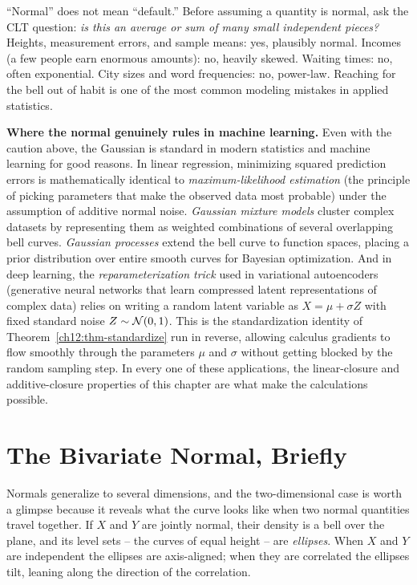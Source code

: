 \begin{trapbox}
``Normal'' does not mean ``default.'' Before assuming a quantity is normal, ask
the CLT question: \emph{is this an average or sum of many small independent
pieces?} Heights, measurement errors, and sample means: yes, plausibly normal.
Incomes (a few people earn enormous amounts): no, heavily skewed. Waiting times:
no, often exponential. City sizes and word frequencies: no, power-law. Reaching
for the bell out of habit is one of the most common modeling mistakes in applied
statistics.
\end{trapbox}

\begin{applicationbox}
\textbf{Where the normal genuinely rules in machine learning.} Even with the
caution above, the Gaussian is standard in modern statistics and machine
learning for good reasons. In linear regression, minimizing squared prediction
errors is mathematically identical to \emph{maximum-likelihood estimation} (the
principle of picking parameters that make the observed data most probable) under
the assumption of additive normal noise. \emph{Gaussian mixture models} cluster
complex datasets by representing them as weighted combinations of several
overlapping bell curves. \emph{Gaussian processes} extend the bell curve to
function spaces, placing a prior distribution over entire smooth curves for
Bayesian optimization. And in deep learning, the \emph{reparameterization trick}
used in variational autoencoders (generative neural networks that learn
compressed latent representations of complex data) relies on writing a random
latent variable as $X = \mu + \sigma Z$ with fixed standard noise $Z \sim \mathcal{N}(0,1)$.
This is the standardization identity of Theorem~\ref{ch12:thm-standardize} run in
reverse, allowing calculus gradients to flow smoothly through the parameters
$\mu$ and $\sigma$ without getting blocked by the random sampling step. In every
one of these applications, the linear-closure and additive-closure properties of
this chapter are what make the calculations possible.
\end{applicationbox}

\section{The Bivariate Normal, Briefly}
\label{ch12:bivariate}

Normals generalize to several dimensions, and the two-dimensional case is worth a
glimpse because it reveals what the curve looks like when two normal quantities
travel together. If $X$ and $Y$ are jointly normal, their density is a bell over
the plane, and its level sets -- the curves of equal height -- are \emph{ellipses}.
When $X$ and $Y$ are independent the ellipses are axis-aligned; when they are
correlated the ellipses tilt, leaning along the direction of the correlation.

